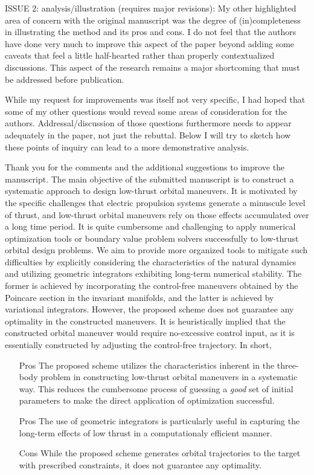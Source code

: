 \documentclass[11pt]{article}
\begin{document}
\begin{itshape}
ISSUE 2: analysis/illustration (requires major revisions): 
My other highlighted area of concern with the original manuscript was the degree of (in)completeness in illustrating the method and its pros and cons.  I do not feel that the authors have done very much to improve this aspect of the paper beyond adding some caveats that feel a little half-hearted rather than properly contextualized discussions.  This aspect of the research remains a major shortcoming that must be addressed before publication.  

While my request for improvements was itself not very specific, I had hoped that some of my other questions would reveal some areas of consideration for the authors.  Addressal/discussion of those questions furthermore needs to appear adequately in the paper, not just the rebuttal. Below I will try to sketch how these points of inquiry can lead to a more demonstrative analysis.
\end{itshape}
\newline\newline
Thank you for the comments and the additional suggestions to improve the manuscript. 
The main objective of the submitted manuscript is to construct a systematic approach to design low-thrust orbital maneuvers. 
It is motivated by the specific challenges that electric propulsion systems generate a minuscule level of thrust, and low-thrust orbital maneuvers rely on those effects accumulated over a long time period. 
It is quite cumbersome and challenging to apply numerical optimization tools or boundary value problem solvers successfully to low-thrust orbital design problems. 
We aim to provide more organized tools to mitigate such difficulties by explicitly considering the characteristics of the natural dynamics and utilizing geometric integrators exhibiting long-term numerical stability. 
The former is achieved by incorporating the control-free maneuvers obtained by the Poincare section in the invariant manifolds, and the latter is achieved by variational integrators. 
However, the proposed scheme does not guarantee any optimality in the constructed maneuvers. 
It is heuristically implied that the constructed orbital maneuver would require no-excessive control input, as it is essentially constructed by adjusting the control-free trajectory. 
In short,
\begin{itemize}
	\item[Pros] The proposed scheme utilizes the characteristics inherent in the three-body problem in constructing low-thrust orbital maneuvers in a systematic way. 
		This reduces the cumbersome process of guessing a \textit{good} set of initial parameters to make the direct application of optimization successful. 
	\item[Pros] The use of geometric integrators is particularly useful in capturing the long-term effects of low thrust in a computationaly efficient manner. 
	\item[Cons] While the proposed scheme generates orbital trajectories to the target with prescribed constraints, it does not guarantee any optimality. 
\end{itemize}
\end{document}
